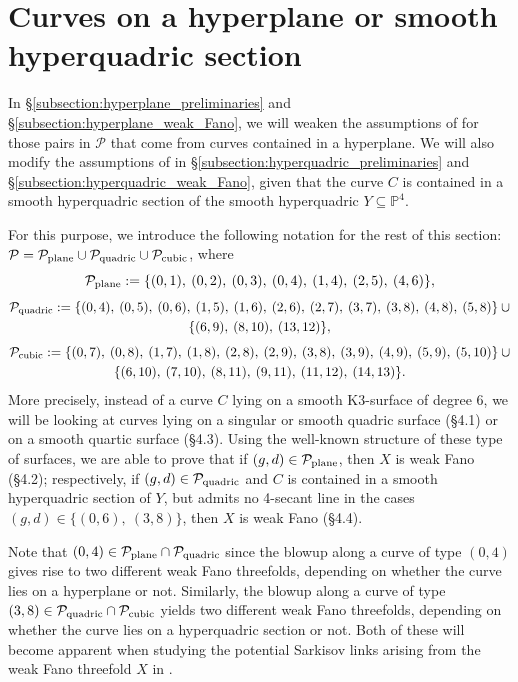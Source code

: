 \documentclass[english,11pt,reqno]{amsart}
\newcommand{\sub}{\subseteq}
\newcommand{\Pfour}{\mathbb{P}^4}
\begin{document}
\section{Curves on a hyperplane or smooth hyperquadric section} \label{section:hyperplane}
%
In \S \ref{subsection:hyperplane_preliminaries} and \S \ref{subsection:hyperplane_weak_Fano}, we will weaken the assumptions of  for those pairs in $\mathcal{P}$ that come from curves contained in a hyperplane. We will also modify the assumptions of  in \S \ref{subsection:hyperquadric_preliminaries} and \S \ref{subsection:hyperquadric_weak_Fano}, given that the curve $C$ is contained in a smooth hyperquadric section of the smooth hyperquadric $Y\sub  \Pfour$. \par
For this purpose, we introduce the following notation for the rest of this section: $\mathcal{P}=\mathcal{P}_{\textup{plane}} \cup \mathcal{P}_{\textup{quadric}} \cup \mathcal{P}_{\textup{cubic}} $, where
$$\mathcal{P}_{\textup{plane}}:=\{(0,1),\:(0,2),\:(0,3),\:(0,4),\:(1,4),\:(2,5),\:(4,6)\},$$
\begin{gather*}
\mathcal{P}_{\textup{quadric}} :=\{ (0,4),\:(0,5),\:(0,6),\:(1,5),\:(1,6),\:(2,6),\:(2,7),\:(3,7),\:(3,8),\:(4,8),\:(5,8)\}\:\cup\\
\{(6,9),\:(8,10),\:(13,12)\},
\end{gather*}
\begin{gather*}
\mathcal{P}_{\textup{cubic}}:=\{(0,7),\:(0,8),\:(1,7),\:(1,8),\:(2,8),\:(2,9),\:(3,8),\:(3,9),\:(4,9),\:(5,9),\:(5,10)\} \:\cup \\\{(6,10),\:(7,10),\:(8,11),\:(9,11),\:(11,12), \:(14,13) \}.
\end{gather*}
More precisely, instead of a curve $C$ lying on a smooth K3-surface of degree 6, we will be looking at curves lying on a singular or smooth quadric surface (\S4.1) or on a smooth  quartic surface (\S4.3). Using the well-known structure of these type of surfaces, we are able to prove that if $(g,d)\in \mathcal{P}_{\textup{plane}}$, then $X$ is weak Fano (\S4.2); respectively, if $(g,d)\in \mathcal{P}_{\textup{quadric}}$ and $C$ is contained in a smooth hyperquadric section of $Y$, but admits no 4-secant line in the cases $(g,d)\in \{(0,6),\:(3,8)\}$, then $X$ is weak Fano (\S4.4). \par
%
Note that $(0,4)\in \mathcal{P}_{\textup{plane}} \cap \mathcal{P}_{\textup{quadric}}$ since the blowup along a curve of type $(0,4)$ gives rise to two different weak Fano threefolds, depending on whether the curve lies on a hyperplane or not. Similarly, the blowup along a curve of type $(3,8) \in \mathcal{P}_{\textup{quadric}} \cap \mathcal{P}_{\textup{cubic}}$  yields two different weak Fano threefolds, depending on whether the curve lies on a hyperquadric section or not. Both of these will become apparent when studying the potential Sarkisov links arising from the weak Fano threefold $X$ in .\par
%
%
%
\end{document}
